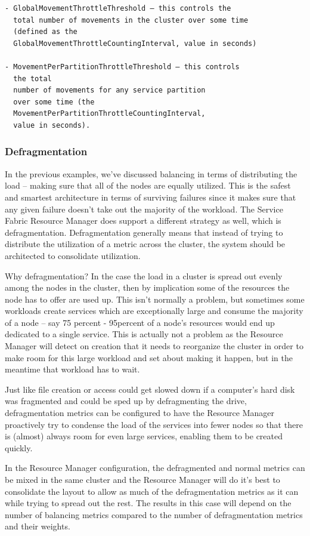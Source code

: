 \begin{verbatim}
- GlobalMovementThrottleThreshold – this controls the
  total number of movements in the cluster over some time
  (defined as the
  GlobalMovementThrottleCountingInterval, value in seconds)

- MovementPerPartitionThrottleThreshold – this controls
  the total
  number of movements for any service partition 
  over some time (the
  MovementPerPartitionThrottleCountingInterval, 
  value in seconds).
\end{verbatim}

\subsubsection{Defragmentation}
In the previous examples, we’ve discussed balancing in terms of
distributing the load – making sure that all of the nodes are equally
utilized. This is the safest and smartest architecture in terms of
surviving failures since it makes sure that any given failure doesn’t
take out the majority of the workload. The Service Fabric Resource
Manager does support a different strategy as well, which is
defragmentation. Defragmentation generally means that instead of
trying to distribute the utilization of a metric across the cluster,
the system should be architected to consolidate utilization.

Why defragmentation? In the case the load in a cluster is spread out
evenly among the nodes in the cluster, then by implication some of the
resources the node has to offer are used up. This isn’t normally a
problem, but sometimes some workloads create services which are
exceptionally large and consume the majority of a node – say 75
percent - 95percent of a node’s resources would end up dedicated to a
single service. This is actually not a problem as the Resource Manager
will detect on creation that it needs to reorganize the cluster in
order to make room for this large workload and set about making it
happen, but in the meantime that workload has to wait.

Just like file creation or access could get slowed down if a
computer’s hard disk was fragmented and could be sped up by
defragmenting the drive, defragmentation metrics can be configured to
have the Resource Manager proactively try to condense the load of the
services into fewer nodes so that there is (almost) always room for
even large services, enabling them to be created quickly.

In the Resource Manager configuration, the defragmented and normal
metrics can be mixed in the same cluster and the Resource Manager will
do it’s best to consolidate the layout to allow as much of the
defragmentation metrics as it can while trying to spread out the
rest. The results in this case will depend on the number of balancing
metrics compared to the number of defragmentation metrics and their
weights.


